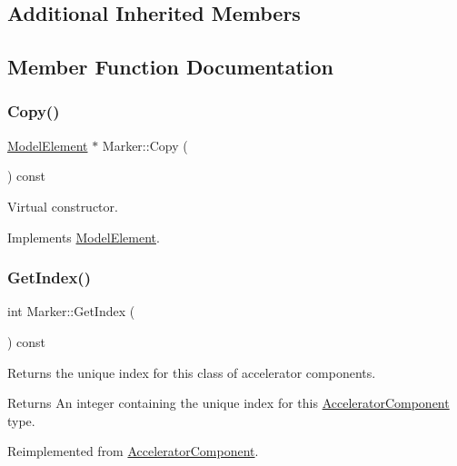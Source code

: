 \subsection*{Additional Inherited Members}


\subsection{Member Function Documentation}
\mbox{\label{classMarker_a79a35a1eac386b87a456cbfff265c9ec}} 
\subsubsection{\texorpdfstring{Copy()}{Copy()}}
{\footnotesize\ttfamily \hyperlink{classModelElement}{Model\+Element} $\ast$ Marker\+::\+Copy (\begin{DoxyParamCaption}{ }\end{DoxyParamCaption}) const\hspace{0.3cm}{\ttfamily [virtual]}}

Virtual constructor. 

Implements \hyperlink{classModelElement_ac3ca26d649bd86a0f31a58ae09941429}{Model\+Element}.

\mbox{\label{classMarker_a3453b35526a601d4c97d689b61f73454}} 
\subsubsection{\texorpdfstring{Get\+Index()}{GetIndex()}}
{\footnotesize\ttfamily int Marker\+::\+Get\+Index (\begin{DoxyParamCaption}{ }\end{DoxyParamCaption}) const\hspace{0.3cm}{\ttfamily [virtual]}}

Returns the unique index for this class of accelerator components. \begin{DoxyReturn}{Returns}
An integer containing the unique index for this \hyperlink{classAcceleratorComponent}{Accelerator\+Component} type. 
\end{DoxyReturn}


Reimplemented from \hyperlink{classAcceleratorComponent_abd1490171ac9af6004d3da01fb3b95fb}{Accelerator\+Component}.

